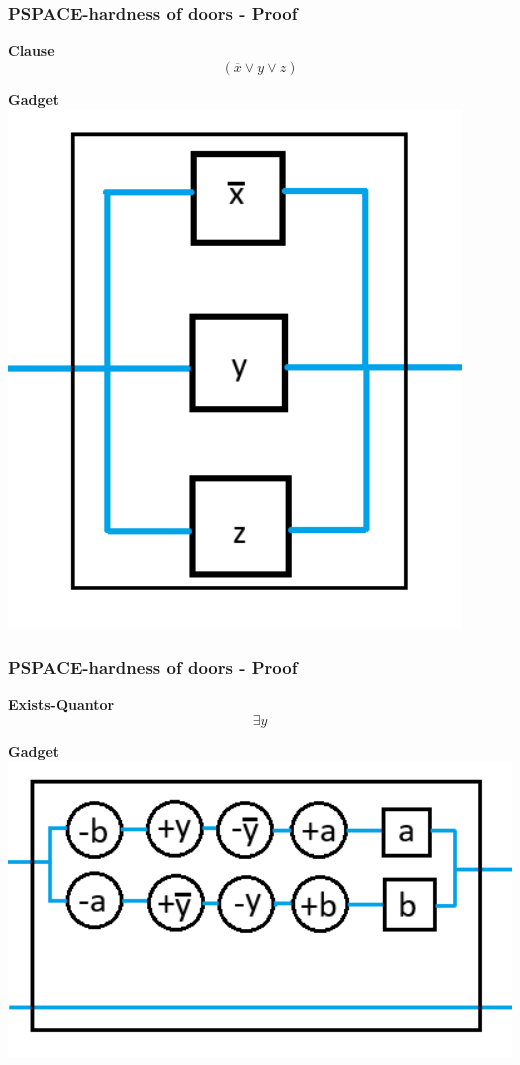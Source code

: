 \documentclass{beamer}
\begin{document}
\begin{frame}
  \frametitle{PSPACE-hardness of doors - Proof}
  \begin{minipage}[t]{0.45\textwidth}
    \textbf{Clause}
    \[ (\overline{x} \lor y \lor z) \]
  \end{minipage}
  \begin{minipage}[t]{0.45\textwidth}
    \textbf{Gadget}
    \includegraphics[width=0.9\textwidth]{res/prove/ClauseGadget.png}
  \end{minipage}
\end{frame}

\begin{frame}
  \frametitle{PSPACE-hardness of doors - Proof}
  \begin{minipage}[t]{0.45\textwidth}
    \textbf{Exists-Quantor}
    \[ \exists y \]
  \end{minipage}
  \begin{minipage}[t]{0.45\textwidth}
    \textbf{Gadget}
    \includegraphics[width=1.3\textwidth]{res/prove/ExsistsGadget.png}
  \end{minipage}
\end{frame}
\end{document}
